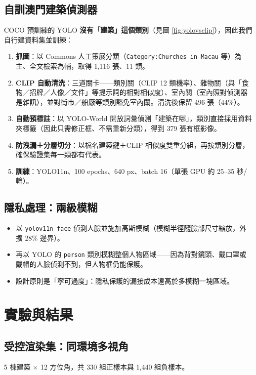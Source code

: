 \documentclass[11pt,a4paper,fontset=windows]{ctexart}
\begin{document}
\subsection{自訓澳門建築偵測器}
COCO 預訓練的 YOLO \textbf{沒有「建築」這個類別}（見圖 \ref{fig:yolovsclip}），因此我們自行建資料集並訓練：
\begin{enumerate}[leftmargin=1.4em,itemsep=2pt]
  \item \textbf{抓圖}：以 Commons 人工策展分類（\texttt{Category:Churches in Macau} 等）為主、全文檢索為輔，取得 1,116 張、11 類。
  \item \textbf{CLIP 自動清洗}：三道關卡——類別關（CLIP 12 類機率）、雜物關（與「食物／招牌／人像／文件」等提示詞的相對相似度）、室內關（室內照對偵測器是雜訊），並對街市／船廠等類別豁免室內關。清洗後保留 496 張（44\%）。
  \item \textbf{自動預標註}：以 YOLO-World 開放詞彙偵測「建築在哪」，類別直接採用資料夾標籤（因此只需修正框、不需重新分類），得到 379 張有框影像。
  \item \textbf{防洩漏＋分層切分}：以檔名建築鍵＋CLIP 相似度雙重分組，再按類別分層，確保驗證集每一類都有代表。
  \item \textbf{訓練}：YOLO11n、100 epochs、640 px、batch 16（單張 GPU 約 25--35 秒/輪）。
\end{enumerate}

\subsection{隱私處理：兩級模糊}
\begin{itemize}[leftmargin=1.4em,itemsep=2pt]
  \item 以 \texttt{yolov11n-face} 偵測人臉並施加高斯模糊（模糊半徑隨臉部尺寸縮放，外擴 28\% 邊界）。
  \item 再以 YOLO 的 \texttt{person} 類別模糊整個人物區域——因為背對鏡頭、戴口罩或戴帽的人臉偵測不到，但人物框仍能保護。
  \item 設計原則是「寧可過度」：隱私保護的漏接成本遠高於多模糊一塊區域。
\end{itemize}

\section{實驗與結果}

\subsection{受控渲染集：同環境多視角}
5 棟建築 $\times$ 12 方位角，共 330 組正樣本與 1,440 組負樣本。
\end{document}

